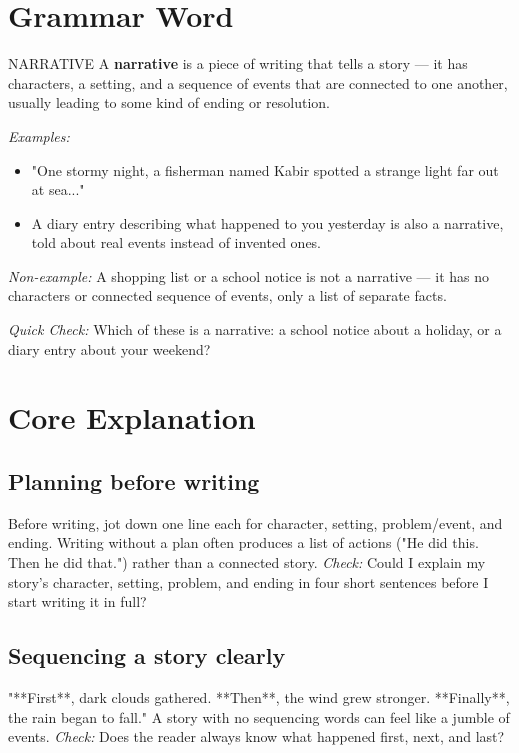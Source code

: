 \section{Grammar Word}
\begin{grammarword}{NARRATIVE}
A \textbf{narrative} is a piece of writing that tells a story — it has characters, a setting, and a sequence of events that are connected to one another, usually leading to some kind of ending or resolution.

\textit{Examples:}
\begin{itemize}
    \item "One stormy night, a fisherman named Kabir spotted a strange light far out at sea..."
    \item A diary entry describing what happened to you yesterday is also a narrative, told about real events instead of invented ones.
\end{itemize}

\textit{Non-example:} A shopping list or a school notice is not a narrative — it has no characters or connected sequence of events, only a list of separate facts.

\textit{Quick Check:} Which of these is a narrative: a school notice about a holiday, or a diary entry about your weekend?
\end{grammarword}

\section{Core Explanation}
\subsection*{Planning before writing}
Before writing, jot down one line each for character, setting, problem/event, and ending. Writing without a plan often produces a list of actions ("He did this. Then he did that.") rather than a connected story. \textit{Check:} Could I explain my story's character, setting, problem, and ending in four short sentences before I start writing it in full?

\subsection*{Sequencing a story clearly}
"**First**, dark clouds gathered. **Then**, the wind grew stronger. **Finally**, the rain began to fall." A story with no sequencing words can feel like a jumble of events. \textit{Check:} Does the reader always know what happened first, next, and last?

